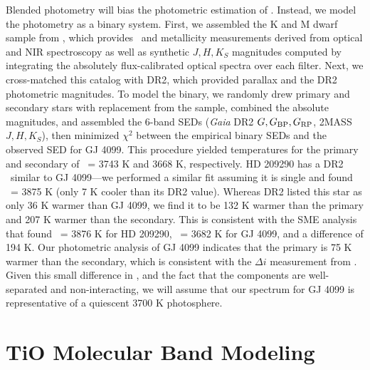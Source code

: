 Blended photometry will bias the photometric estimation of \teff. 
Instead, we model the photometry as a binary system. 
First, we assembled the K and M dwarf sample from 
\citet{Mann2015}, which provides \teff\ and metallicity measurements derived from optical and NIR spectroscopy 
as well as synthetic $J, H, K_S$ magnitudes computed 
by integrating the absolutely flux-calibrated optical spectra over each filter. 
Next, we cross-matched this catalog with DR2, 
which provided parallax and the DR2 photometric magnitudes. 
To model the binary, we randomly drew primary and secondary stars with replacement from the sample, 
combined the absolute magnitudes, and assembled the 6-band SEDs
(\textit{Gaia} DR2 $G, G_{\rm BP}, G_{\rm RP}$, 
2MASS $J, H, K_S$),
then minimized $\chi^2$ between the empirical binary SEDs and the observed SED for GJ 4099. 
This procedure yielded temperatures for the primary and secondary of 
\teff\ = 3743 K and 3668 K, respectively. 
HD 209290 has a DR2 \teff\ similar to GJ 4099---we performed a similar fit assuming it is single and found \teff\ = 3875 K (only 7 K cooler 
than its DR2 value).
Whereas DR2 listed this star as only 36 K warmer than GJ 4099, 
we find it to be 132 K warmer than the primary and 207 K warmer than the secondary.
This is consistent with the SME analysis that found 
\teff\ = 3876 K for HD 209290, 
\teff\ = 3682 K for GJ 4099, 
and a difference of 194 K.
Our photometric analysis of GJ 4099 indicates that the primary is 75 K warmer than the secondary, 
which is consistent with the $\Delta i$ measurement from \citet{GJ4099binary}.
Given this small difference in \teff, and the fact that the components 
are well-separated and non-interacting, 
we will assume that our spectrum for GJ 4099 is representative of 
a quiescent 3700 K photosphere.


%

%

\section{TiO Molecular Band Modeling} \label{sec:tio}

